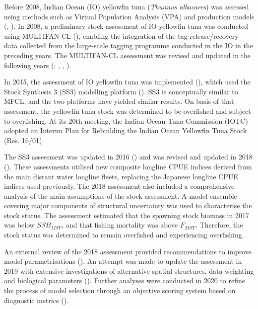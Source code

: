 \documentclass[
]{scrartcl}
\begin{document}
Before 2008, Indian Ocean (IO) yellowfin tuna (\emph{Thunnus albacares})
was assessed using methods such as Virtual Population Analysis (VPA) and
production models
(, ). In
2008, a preliminary stock assessment of IO yellowfin tuna was conducted
using MULTIFAN-CL
(), enabling the integration of the tag release/recovery data
collected from the large-scale tagging programme conducted in the IO in
the preceding years. The MULTIFAN-CL assessment was revised and updated
in the following years
(; ,
,
).

In 2015, the assessment of IO yellowfin tuna was implemented
(),
which used the Stock Synthesis 3 (SS3) modelling platform
(). SS3 is conceptually similar to MFCL, and the two platforms have
yielded similar results. On basis of that assessment, the yellowfin tuna
stock was determined to be overfished and subject to overfishing. At its
20th meeting, the Indian Ocean Tuna Commission (IOTC) adopted an Interim
Plan for Rebuilding the Indian Ocean Yellowfin Tuna Stock (Res. 16/01).

The SS3 assessment was updated in 2016
() and was
revised and updated in 2018
(). These
assessments utilised new composite longline CPUE indices derived from
the main distant water longline fleets, replacing the Japanese longline
CPUE indices used previously. The 2018 assessment also included a
comprehensive analysis of the main assumptions of the stock assessment.
A model ensemble covering major components of structural uncertainty was
used to characterise the stock status. The assessment estimated that the
spawning stock biomass in 2017 was below \(SSB_{MSY}\), and that fishing
mortality was above \(F_{MSY}\). Therefore, the stock status was
determined to remain overfished and experiencing overfishing.

An external review of the 2018 assessment provided recommendations to
improve model parametrisations
(). An attempt was made to update the assessment in 2019 with
extensive investigations of alternative spatial structures, data
weighting and biological parameters
(). Further analyses were conducted in 2020 to refine the
process of model selection through an objective scoring system based on
diagnostic metrics
().
\end{document}
